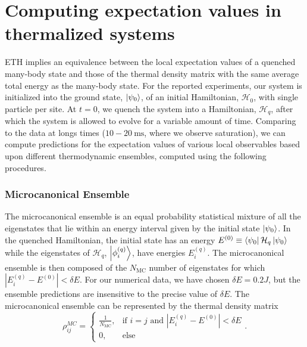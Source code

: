 \chapter{Computing expectation values in thermalized systems}
\label{AppendixA}

ETH implies an equivalence between the local expectation values of a quenched many-body state and those of the thermal density matrix with the same average total energy as the many-body state. For the reported experiments, our system is initialized into the ground
state, $\left|\psi_0\right\rangle$, of an initial Hamiltonian, $\mathcal H_0$, with single particle per site. At $t = 0$, we quench the system into a Hamiltonian, $\mathcal H_q$, after which the system is allowed to evolve for a variable amount of time. Comparing to the data at longs times ($10-20~\mathrm{ms}$, where we observe saturation), we can compute predictions for the expectation values of various local observables based upon different thermodynamic ensembles, computed using the following procedures.


\subsection*{Microcanonical Ensemble}
The microcanonical ensemble is an equal probability statistical mixture of all the eigenstates that lie within an energy interval given by the initial state $\left|\psi_0\right\rangle$. In the quenched Hamiltonian, the initial state has an energy $E^{(0)} \equiv \left\langle \psi_0\right| \mathcal H_q \left|\psi_0\right\rangle$ while the eigenstates of $\mathcal H_q$, $\left|\phi^{(q)}_i\right\rangle$, have energies $E_i^{(q)}$. The microcanonical ensemble is then composed of the $N_\text{MC}$ number of eigenstates for which ${|E_i^{(q)} - E^{(0)}| < \delta E}$. For our numerical data, we have chosen $\delta E = 0.2 J$, but the ensemble predictions are insensitive to the precise value of $\delta E$. The microcanonical ensemble can be represented by the thermal density matrix
\begin{equation}
\rho_{ij}^{MC} = 
	\begin{cases} 
		\frac{1}{N_{\text{MC}}}, & \text{if $i = j$ and $|E_i^{(q)} - E^{(0)}| < \delta E$} \\
		0, & \text{else}
	\end{cases}.
\end{equation}

